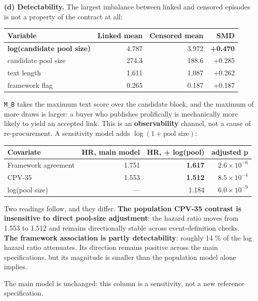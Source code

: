 \textbf{(d) Detectability.} The largest imbalance between linked and censored episodes is not a property of the contract at all:

\begingroup\footnotesize
\begin{longtable}[]{@{}lrrr@{}}
\toprule\noalign{}
Variable & Linked mean & Censored mean & SMD \\
\midrule\noalign{}
\endhead
\bottomrule\noalign{}
\endlastfoot
\textbf{log(candidate pool size)} & 4.787 & 3.972 & \textbf{+0.470} \\
candidate pool size & 274.3 & 188.6 & +0.285 \\
text length & 1,611 & 1,087 & +0.262 \\
framework flag & 0.265 & 0.187 & +0.187 \\
\end{longtable}
\endgroup

\texttt{M\_B} takes the maximum text score over the candidate block, and the maximum of more draws is larger: a buyer who publishes prolifically is mechanically more likely to yield an accepted link. This is an \textbf{observability} channel, not a cause of re-procurement. A sensitivity model adds \(\log(1 + \text{pool size})\):

\begingroup\footnotesize
\begin{longtable}[]{@{}lrrr@{}}
\toprule\noalign{}
Covariate & HR, main model & HR, + log(pool) & adjusted p \\
\midrule\noalign{}
\endhead
\bottomrule\noalign{}
\endlastfoot
Framework agreement & 1.751 & \textbf{1.617} & $2.6\times 10^{-6}$ \\
CPV-35 & 1.553 & \textbf{1.512} & $8.5\times 10^{-4}$ \\
log(pool size) & --- & 1.184 & $6.0\times 10^{-9}$ \\
\end{longtable}
\endgroup

Two readings follow, and they differ. \textbf{The population CPV-35 contrast is insensitive to direct pool-size adjustment}: the hazard ratio moves from 1.553 to 1.512 and remains directionally stable across event-definition checks. \textbf{The framework association is partly detectability}: roughly 14 \% of the log hazard ratio attenuates. Its direction remains positive across the main specifications, but its magnitude is smaller than the population model alone implies.

The main model is unchanged: this column is a sensitivity, not a new reference specification.

